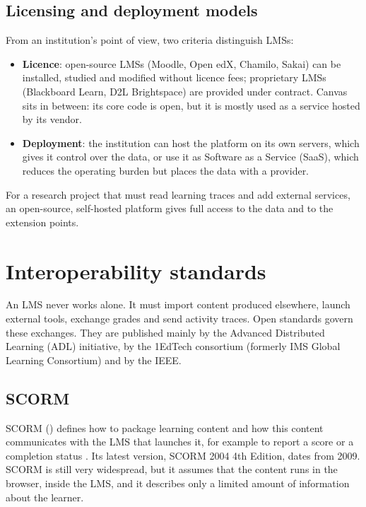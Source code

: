 \subsection{Licensing and deployment models}

From an institution's point of view, two criteria distinguish LMSs:

\begin{itemize}
  \item \textbf{Licence}: open-source LMSs (Moodle, Open edX, Chamilo,
        Sakai) can be installed, studied and modified without licence
        fees; proprietary LMSs (Blackboard Learn, D2L Brightspace) are
        provided under contract. Canvas sits in between: its core code is
        open, but it is mostly used as a service hosted by its vendor.
  \item \textbf{Deployment}: the institution can host the platform on its
        own servers, which gives it control over the data, or use it as
        Software as a Service (SaaS), which reduces the operating burden
        but places the data with a provider.
\end{itemize}

For a research project that must read learning traces and add external
services, an open-source, self-hosted platform gives full access to the
data and to the extension points.

\section{Interoperability standards}
\label{sec-standards}

An LMS never works alone. It must import content produced elsewhere,
launch external tools, exchange grades and send activity traces. Open
standards govern these exchanges. They are published mainly by the
Advanced Distributed Learning (ADL) initiative, by the 1EdTech consortium
(formerly IMS Global Learning Consortium) and by the IEEE.

\subsection{SCORM}

SCORM () defines how to
package learning content and how this content communicates with the LMS
that launches it, for example to report a score or a completion status
\cite{adl_scorm}. Its latest version, SCORM 2004 4th Edition, dates from
2009. SCORM is still very widespread, but it assumes that the content runs
in the browser, inside the LMS, and it describes only a limited amount of
information about the learner.

